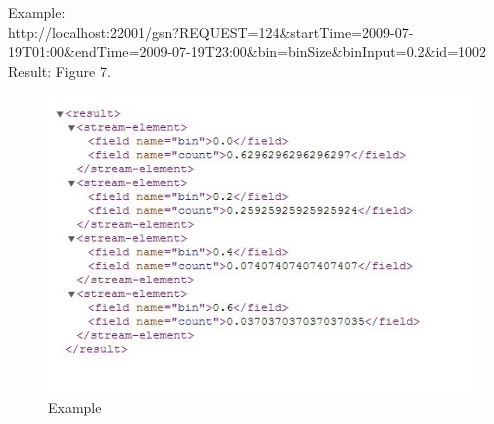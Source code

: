 \documentclass[12pt]{article}
\begin{document}
Example:  \\
  
http://localhost:22001/gsn?REQUEST=124\&startTime=2009-07-19T01:00\&endTime=2009-07-19T23:00\&bin=binSize\&binInput=0.2\&id=1002\\

Result: Figure 7.

\begin{figure}
		\centering
			\includegraphics{REQUEST_SMARTD_VALUE_DISTRIBUTION.JPG}
		\caption{Example}
\end{figure}
      
      
\end{document}
